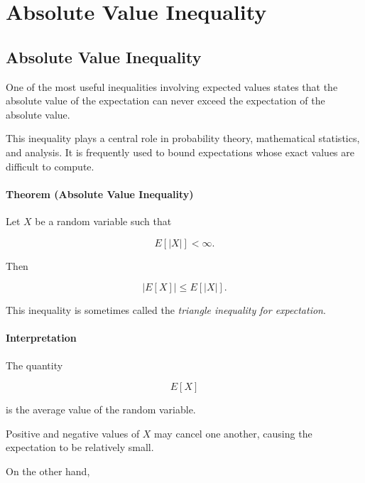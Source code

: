 \documentclass[11pt]{article}
\begin{document}
	\section{Absolute Value Inequality}
	\begin{mdframed}[
		linewidth=0.8pt,
		roundcorner=6pt,
		backgroundcolor=gray!5,
		linecolor=gray!60,
		innertopmargin=10pt,
		innerbottommargin=10pt,
		innerleftmargin=10pt,
		innerrightmargin=10pt
		]
		
		\subsection*{Absolute Value Inequality}
		
		One of the most useful inequalities involving expected values states that the
		absolute value of the expectation can never exceed the expectation of the
		absolute value.
		
		This inequality plays a central role in probability theory, mathematical
		statistics, and analysis. It is frequently used to bound expectations whose
		exact values are difficult to compute.
		
		\bigskip
		
		\paragraph{Theorem (Absolute Value Inequality)}
		
		Let \(X\) be a random variable such that
		
		\[
		E[|X|]
		<
		\infty.
		\]
		
		Then
		
		\[
		\boxed{
			|E[X]|
			\le
			E[|X|].
		}
		\]
		
		This inequality is sometimes called the \emph{triangle inequality for
			expectation}.
		
		\bigskip
		
		\paragraph{Interpretation}
		
		The quantity
		
		\[
		E[X]
		\]
		
		is the average value of the random variable.
		
		Positive and negative values of \(X\) may cancel one another, causing the
		expectation to be relatively small.
		
		On the other hand,
		

\end{mdframed}
\end{document}
